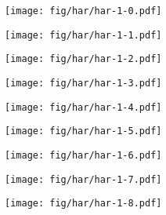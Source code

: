 \documentclass{beamer}
\begin{document}
\begin{frame}
\begin{columns}[t]
\begin{column}{4cm}
  {
    \begin{figure}[h!]
      \centering
      \texttt{[image: fig/har/har-1-0.pdf]}
    \end{figure}
  }
  {
    \begin{figure}[h!]
      \centering
      \texttt{[image: fig/har/har-1-1.pdf]}
    \end{figure}
  }
  {
    \begin{figure}[h!]
      \centering
      \texttt{[image: fig/har/har-1-2.pdf]}
    \end{figure}
  }
  {
    \begin{figure}[h!]
      \centering
      \texttt{[image: fig/har/har-1-3.pdf]}
    \end{figure}
  }
  {
    \begin{figure}[h!]
      \centering
      \texttt{[image: fig/har/har-1-4.pdf]}
    \end{figure}
  }
  {
    \begin{figure}[h!]
      \centering
      \texttt{[image: fig/har/har-1-5.pdf]}
    \end{figure}
  }
  {
    \begin{figure}[h!]
      \centering
      \texttt{[image: fig/har/har-1-6.pdf]}
    \end{figure}
  }
  {
    \begin{figure}[h!]
      \centering
      \texttt{[image: fig/har/har-1-7.pdf]}
    \end{figure}
  }
  {
    \begin{figure}[h!]
      \centering
      \texttt{[image: fig/har/har-1-8.pdf]}
    \end{figure}
  }   
  \end{column}
\end{columns} 
\end{frame}
\end{document}

